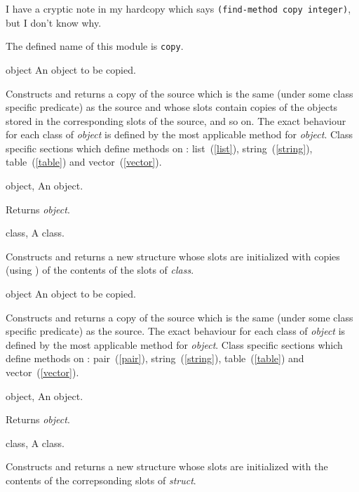 \label{copy}
%
\begin{optPrivate}
    I have a cryptic note in my hardcopy which says {\tt (find-method copy
        integer)}, but I don't know why.
\end{optPrivate}
%
\begin{optDefinition}
\noindent
The defined name of this module is {\tt copy}.

%
\begin{genericargs}
    \item[object] An object to be copied.
\end{genericargs}
%
\result%
Constructs and returns a copy of the source which is the same (under some class
specific predicate) as the source and whose slots contain copies of the objects
stored in the corresponding slots of the source, and so on.  The exact behaviour
for each class of {\em object\/} is defined by the most applicable method for
{\em object}.
%
\seealso%
Class specific sections which define methods on :
list~(\ref{list}), string~(\ref{string}), table~(\ref{table}) and
vector~(\ref{vector}).

%
\begin{specargs}
    \item[object, \classref{object}] An object.
\end{specargs}
%
\result%
Returns {\em object}.

%
\begin{specargs}
    \item[class, \classref{class}] A class.
\end{specargs}
%
\result%
Constructs and returns a new structure whose slots are initialized with copies
(using ) of the contents of the slots of {\em class}.

%
\begin{genericargs}
    \item[object] An object to be copied.
\end{genericargs}
%
\result%
Constructs and returns a copy of the source which is the same (under
some class specific predicate) as the source.  The exact behaviour for
each class of {\em object\/} is defined by the most applicable method
for {\em object}.
%
\seealso%
Class specific sections which define methods on :
pair~(\ref{pair}), string~(\ref{string}), table~(\ref{table}) and
vector~(\ref{vector}).

%
\begin{specargs}
    \item[object, \classref{object}] An object.
\end{specargs}
%
\result%
Returns {\em object}.
%
%
\begin{specargs}
    \item[class, \classref{class}] A class.
\end{specargs}
%
\result
Constructs and returns a new structure whose slots are initialized
with the contents of the correpsonding slots of {\em struct}.
%
\end{optDefinition}
